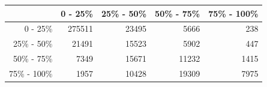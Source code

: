 \begin{tabular}{r|rrrr}
\hline
 & 0 - 25\% & 25\% - 50\% & 50\% - 75\% & 75\% - 100\% \\ 
  \hline
  0 - 25\% & 275511 & 23495 & 5666 & 238 \\
  25\% - 50\% & 21491 & 15523 & 5902 & 447 \\
  50\% - 75\% & 7349 & 15671 & 11232 & 1415 \\
  75\% - 100\% & 1957 & 10428 & 19309 & 7975 \\
 \hline
\end{tabular}

